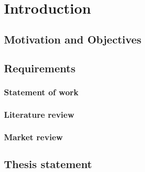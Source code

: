 
\chapter{Introduction}



\section{Motivation and Objectives}


\section{Requirements}
\subsection{Statement of work}
\subsection{Literature review}
\subsection{Market review} 
\section{Thesis statement} %
